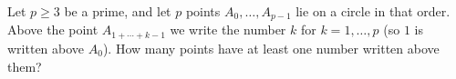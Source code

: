 Let $ p \geq 3$ be a prime, and let $ p$ points $ A_{0}, \ldots, A_{p-1}$ lie on a circle in that order. Above the point $ A_{1+\cdots+k-1}$ we write the number $ k$ for $ k=1, \ldots, p$ (so $ 1$ is written above $ A_{0}$). How many points have at least one number written above them?